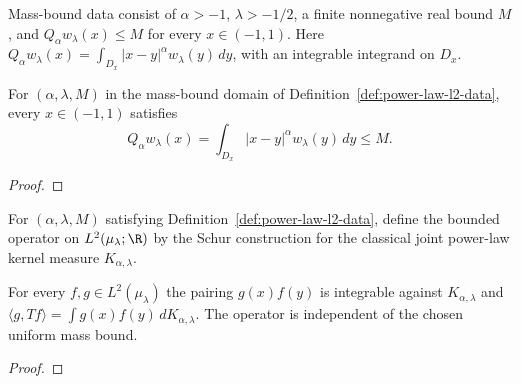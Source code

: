 \begin{supporting}
\begin{definition}
\label{def:power-law-l2-data}
\leanok
Mass-bound data consist of $\alpha>-1$, $\lambda>-1/2$, a finite nonnegative
real bound $M$, and $Q_\alpha w_\lambda(x)\le M$ for every $x\in(-1,1)$.
Here $Q_\alpha w_\lambda(x)=\int_{D_x}|x-y|^\alpha w_\lambda(y)\,dy$, with an integrable integrand on $D_x$.
\end{definition}
\begin{theorem}
\label{thm:power-law-l2-data}
\leanok
For $(\alpha,\lambda,M)$ in the mass-bound domain of
Definition~\ref{def:power-law-l2-data}, every $x\in(-1,1)$ satisfies
\[
 Q_\alpha w_\lambda(x)
 =\int_{D_x}|x-y|^\alpha w_\lambda(y)\,dy\le M.
\]
\end{theorem}
\begin{proof}
\leanok
\end{proof}

\begin{definition}
\label{def:power-law-l2-operator}
\leanok
For $(\alpha,\lambda,M)$ satisfying Definition~\ref{def:power-law-l2-data}, define the bounded operator on
$L^2(\mu_\lambda;\R)$ by the Schur construction for the classical joint
power-law kernel measure $K_{\alpha,\lambda}$.
\end{definition}
\begin{theorem}
\label{thm:power-law-l2-characterisation}
\leanok
For every $f,g\in L^2(\mu_\lambda)$ the pairing $g(x)f(y)$ is integrable
against $K_{\alpha,\lambda}$ and
$\langle g,Tf\rangle=\int g(x)f(y)\,dK_{\alpha,\lambda}$.
The operator is independent of the chosen uniform mass bound.
\end{theorem}
\begin{proof}
\leanok
\end{proof}


\end{supporting}
